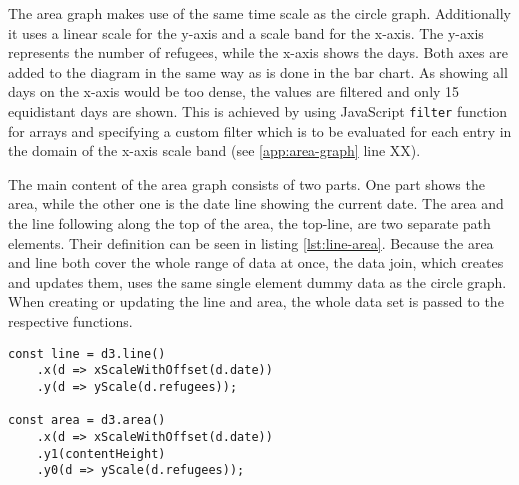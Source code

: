The area graph makes use of the same time scale as the circle graph. Additionally it uses a linear scale for the y-axis and a scale band for the x-axis. The y-axis represents the number of refugees, while the x-axis shows the days. Both axes are added to the diagram in the same way as is done in the bar chart. As showing all days on the x-axis would be too dense, the values are filtered and only 15 equidistant days are shown. This is achieved by using JavaScript \texttt{filter} function for arrays and specifying a custom filter which is to be evaluated for each entry in the domain of the x-axis scale band (see \ref{app:area-graph} line XX).

The main content of the area graph consists of two parts. One part shows the area, while the other one is the date line showing the current date. The area and the line following along the top of the area, the top-line, are two separate path elements. Their definition can be seen in listing \ref{lst:line-area}. Because the area and line both cover the whole range of data at once, the data join, which creates and updates them, uses the same single element dummy data as the circle graph. When creating or updating the line and area, the whole data set is passed to the respective functions.

\begin{minipage}{0.9\linewidth}
    \begin{lstlisting}[style=htmlCSSjs, captionpos=b, caption={The first constant defines the function for creating the top-line of the area graph. This is achieved by specifying functions for x- and y-values. D3 uses them to calculate the position of each point on the line. Using the arrow functions here applies this for each entry of the data set which is passed as a parameter when calling this function. When the function is called and a data set is provided, by calling \texttt{line(data)}, the line is constructed by calculating the according x- and y-positions for every data point. Defining and creating the area works in similar fashion. Yet there are two y-positions for each x-position. \texttt{y0} is the bottom of the shape, while \texttt{y1} is the top. Switching the definition of \texttt{y0} and \texttt{y1} results in a reversed direction of the SVG path describing the outline of the shape. The \texttt{d3.area()} function allows for a huge variety of shapes. Yet it is not possible to create concave ends on the right or left side of the shape, assuming left and rigth are oriented horizontally. Of course the created shape can be rotated and oriented using all possible SVG tags and attributes. (Section from \ref{app:area-graph} lines 111ff)}, label={lst:line-area}]
const line = d3.line()
    .x(d => xScaleWithOffset(d.date))
    .y(d => yScale(d.refugees));

const area = d3.area()
    .x(d => xScaleWithOffset(d.date))
    .y1(contentHeight)
    .y0(d => yScale(d.refugees));
    \end{lstlisting}
\end{minipage}


